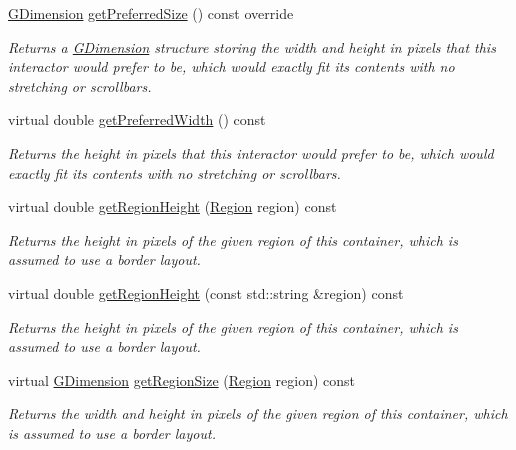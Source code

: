 \begin{DoxyCompactItemize}
\mbox{\hyperlink{structsgl_1_1GDimension}{G\+Dimension}} \mbox{\hyperlink{classsgl_1_1GContainer_ac0fd6fc35681f935c67ad68078b354b8}{get\+Preferred\+Size}} () const override
\begin{DoxyCompactList}\small\item\em Returns a \mbox{\hyperlink{structsgl_1_1GDimension}{G\+Dimension}} structure storing the width and height in pixels that this interactor would prefer to be, which would exactly fit its contents with no stretching or scrollbars. \end{DoxyCompactList}\item 
virtual double \mbox{\hyperlink{classsgl_1_1GInteractor_a82bca31d37700fb0e35d2743352efd5e}{get\+Preferred\+Width}} () const
\begin{DoxyCompactList}\small\item\em Returns the height in pixels that this interactor would prefer to be, which would exactly fit its contents with no stretching or scrollbars. \end{DoxyCompactList}\item 
virtual double \mbox{\hyperlink{classsgl_1_1GContainer_a164d248057318961e7f2abc8c3477d63}{get\+Region\+Height}} (\mbox{\hyperlink{classsgl_1_1GContainer_a81a01a86de31071a92e6cce0bab9bc4b}{Region}} region) const
\begin{DoxyCompactList}\small\item\em Returns the height in pixels of the given region of this container, which is assumed to use a border layout. \end{DoxyCompactList}\item 
virtual double \mbox{\hyperlink{classsgl_1_1GContainer_ae8a545e772745b89edaf9804a2dc0057}{get\+Region\+Height}} (const std\+::string \&region) const
\begin{DoxyCompactList}\small\item\em Returns the height in pixels of the given region of this container, which is assumed to use a border layout. \end{DoxyCompactList}\item 
virtual \mbox{\hyperlink{structsgl_1_1GDimension}{G\+Dimension}} \mbox{\hyperlink{classsgl_1_1GContainer_a3b5db9ffbd4b32260f80634f162dba4e}{get\+Region\+Size}} (\mbox{\hyperlink{classsgl_1_1GContainer_a81a01a86de31071a92e6cce0bab9bc4b}{Region}} region) const
\begin{DoxyCompactList}\small\item\em Returns the width and height in pixels of the given region of this container, which is assumed to use a border layout. \end{DoxyCompactList}\item 

\end{DoxyCompactItemize}

